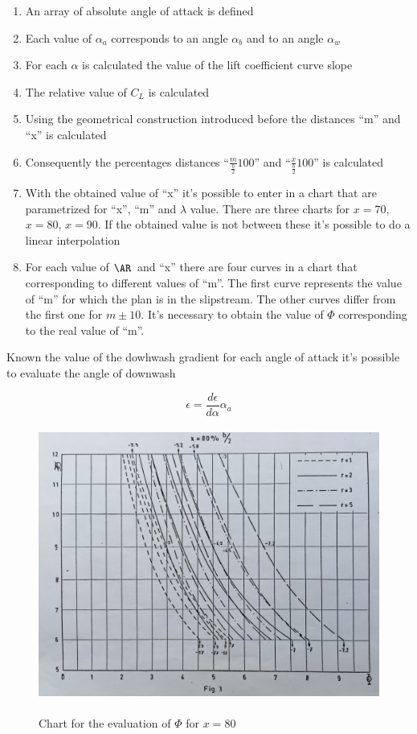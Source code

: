 \begin{enumerate}
	\item An array of absolute angle of attack is defined
	\item Each value of $\alpha_a$ corresponds to an angle $\alpha_b$ and to an angle $\alpha_w$
	\item For each $\alpha$ is calculated the value of the lift coefficient curve slope
	\item The relative value of $C_L$ is calculated
	\item Using the geometrical construction introduced before the distances ``m'' and ``x'' is calculated
	\item Consequently the percentages distances ``$\frac{m}{\frac{b}{2}} 100$'' and ``$\frac{x}{\frac{b}{2}} 100$'' is calculated
	\item With the obtained value of ``x'' it's possible to enter in a chart that are parametrized for ``x'', ``m'' and $\lambda$ value. There are three charts for $x=70$, $x=80$, $x=90$. If the obtained value is not between these it's possible to do a linear interpolation
	\item For each value of $\AR$\ and ``x'' there are four curves in a chart that corresponding to different values of ``m''. The first curve represents the value of ``m'' for which the plan is in the slipstream. The other curves differ from the first one for $m \pm 10$. It's necessary to obtain the value of $\Phi$ corresponding to the real value of  ``m''.
\end{enumerate}

Known the value of the dowhwash gradient for each angle of attack it's possible to evaluate the angle of downwash

\begin{equation}
\epsilon = \frac{d\epsilon}{d\alpha} \alpha_a
\end{equation}
\begin{figure}[H]
\centering
{\includegraphics[height=9cm]{immagini/Giord80.jpg}} 
\caption{Chart for the evaluation of $\Phi$ for $x=80$}
\label{giordanodata}
\end{figure} 

